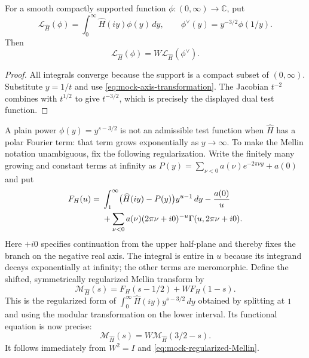 \begin{proposition}\label{prop:mock-test-function}
For a smooth compactly supported function $\phi:(0,\infty)\to\mathbb C$, put
\[
 \mathcal L_{\widehat H}(\phi)=
       \int_0^\infty\widehat H(iy)\phi(y)\,dy,
 \qquad \phi^\vee(y)=y^{-3/2}\phi(1/y).
\]
Then
\begin{equation}\label{eq:mock-test-functional}
 \mathcal L_{\widehat H}(\phi)
       =W\mathcal L_{\widehat H}(\phi^\vee).
\end{equation}
\end{proposition}
\begin{proof}
All integrals converge because the support is a compact subset of
$(0,\infty)$.  Substitute $y=1/t$ and use
\eqref{eq:mock-axis-transformation}.  The Jacobian $t^{-2}$ combines with
$t^{1/2}$ to give $t^{-3/2}$, which is precisely the displayed dual test
function.
\end{proof}

A plain power $\phi(y)=y^{s-3/2}$ is not an admissible test function when
$\widehat H$ has a polar Fourier term: that term grows exponentially as
$y\to\infty$.  To make the Mellin notation unambiguous, fix the following
regularization.  Write the finitely many growing and constant terms at
infinity as
$P(y)=\sum_{\nu<0}a(\nu)e^{-2\pi\nu y}+a(0)$ and put
\begin{align}
 F_H(u)={}&\int_1^\infty\bigl(\widehat H(iy)-P(y)\bigr)y^{u-1}\,dy
 -\frac{a(0)}u\notag\\
 &+\sum_{\nu<0}a(\nu)(2\pi\nu+i0)^{-u}
                 \Gamma(u,2\pi\nu+i0).\label{eq:mock-tail-regularization}
\end{align}
Here $+i0$ specifies continuation from the upper half-plane and thereby
fixes the branch on the negative real axis.  The integral is entire in
$u$ because its integrand decays exponentially at infinity; the other
terms are meromorphic.  Define the shifted, symmetrically regularized
Mellin transform by
\begin{equation}\label{eq:mock-regularized-Mellin}
 \mathcal M_{\widehat H}(s)=F_H(s-1/2)+WF_H(1-s).
\end{equation}
This is the regularized form of
$\int_0^\infty\widehat H(iy)y^{s-3/2}\,dy$ obtained by splitting at $1$
and using the modular transformation on the lower interval.
Its functional equation is now precise:
\begin{equation}\label{eq:mock-Mellin-FE}
 \mathcal M_{\widehat H}(s)
       =W\mathcal M_{\widehat H}(3/2-s).
\end{equation}
It follows immediately from $W^2=I$ and
\eqref{eq:mock-regularized-Mellin}.

